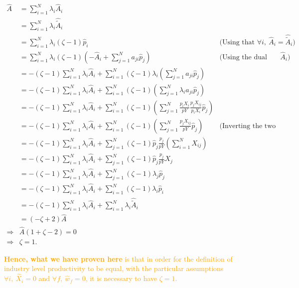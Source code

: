 \documentclass[11pt]{article}
\begin{document}
\begin{align*}
    \hat{A}&=\sum_{i=1}^N \lambda_i \hat{A}_i\\
    & = \sum_{i=1}^N \lambda_i \hat{\tilde{A}}_i\\
    & = \sum_{i=1}^N \lambda_i (\zeta - 1) \hat{p}_i &\text{(Using that }\forall i, ~\hat{A}_i= \hat{\tilde{A}}_i) \\
    & = \sum_{i=1}^N \lambda_i (\zeta - 1) \left(-\hat{A}_i + \sum_{j=1}^N  a_{ji} \hat{p}_j\right) &\text{(Using the dual def. of }\hat{A}_i) \\
    & = -(\zeta - 1)\sum_{i=1}^N \lambda_i  \hat{A}_i +\sum_{i=1}^N(\zeta - 1) \lambda_i \left(\sum_{j=1}^N  a_{ji} \hat{p}_j\right)\\
    & = -(\zeta - 1)\sum_{i=1}^N \lambda_i  \hat{A}_i +\sum_{i=1}^N(\zeta - 1)  \left(\sum_{j=1}^N  \lambda_i a_{ji} \hat{p}_j\right)\\
        & = -(\zeta - 1)\sum_{i=1}^N \lambda_i  \hat{A}_i +\sum_{i=1}^N(\zeta - 1)  \left(\sum_{j=1}^N  \frac{p_iX_i}{pY} \frac{p_jX_{ij}}{p_iX_i} \hat{p}_j\right)\\
        & = -(\zeta - 1)\sum_{i=1}^N \lambda_i  \hat{A}_i +\sum_{i=1}^N(\zeta - 1)  \left(\sum_{j=1}^N\frac{p_jX_{ij}}{pY} \hat{p}_j\right) &\text{(Inverting the two sums)} \\
        & = -(\zeta - 1)\sum_{i=1}^N \lambda_i  \hat{A}_i +\sum_{j=1}^N(\zeta - 1)  \hat{p}_j\frac{p_j}{pY} \left(\sum_{i=1}^N X_{ij}\right)\\
        & = -(\zeta - 1)\sum_{i=1}^N \lambda_i  \hat{A}_i +\sum_{j=1}^N(\zeta - 1)  \hat{p}_j \frac{p_j}{pY} X_j\\
        & = -(\zeta - 1)\sum_{i=1}^N \lambda_i  \hat{A}_i +\sum_{j=1}^N(\zeta - 1)  \lambda_j \hat{p}_j\\
           & = -(\zeta - 1)\sum_{i=1}^N \lambda_i  \hat{A}_i +\sum_{i=1}^N(\zeta - 1)  \lambda_i \hat{p}_i\\
         & = -(\zeta - 1)\sum_{i=1}^N \lambda_i  \hat{A}_i +\sum_{i=1}^N \lambda_i \hat{\tilde{A}}_i\\
            & = (-\zeta + 2)\hat{A}\\
        \Rightarrow & \hat{A}(1+\zeta-2)=0\\
        \Rightarrow & \zeta=1.
\end{align*}

\textcolor{orange}{
\textbf{Hence, what we have proven here} is that in order for the definition of industry level productivity to be equal, with the particular assumptions  $\forall i,~\hat{X}_i=0$ and $\forall f, ~ \hat{w}_f =0$, it is necessary to have $\zeta=1$.}
\end{document}
